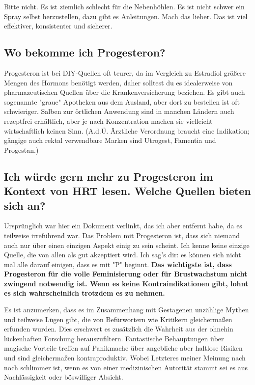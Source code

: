 \documentclass{article}
\begin{document}
Bitte nicht. Es ist ziemlich schlecht für die Nebenhöhlen. Es ist nicht schwer ein Spray selbst herzustellen, dazu gibt es Anleitungen. Mach das lieber. Das ist viel effektiver, konsistenter und sicherer.

\subsection{Wo bekomme ich Progesteron?}

Progesteron ist bei DIY-Quellen oft teurer, da im Vergleich zu Estradiol größere Mengen des Hormons benötigt werden, daher solltest du es idealerweise von pharmazeutischen Quellen über die Krankenversicherung beziehen. Es gibt auch sogenannte "graue" Apotheken aus dem Ausland, aber dort zu bestellen ist oft schwieriger. Salben zur örtlichen Anwendung sind in manchen Ländern auch rezeptfrei erhältlich, aber je nach Konzentration machen sie vielleicht wirtschaftlich keinen Sinn.  (A.d.Ü. Ärztliche Verordnung braucht eine Indikation; gängige auch rektal verwendbare Marken sind Utrogest, Famentia und Progestan.)

\subsection{Ich würde gern mehr zu Progesteron im Kontext von HRT lesen. Welche Quellen bieten sich an?}\label{8-17}

Ursprünglich war hier ein Dokument verlinkt, das ich aber entfernt habe, da es teilweise irreführend war. Das Problem mit Progesteron ist, dass sich niemand auch nur über einen einzigen Aspekt einig zu sein scheint. Ich kenne keine einzige Quelle, die von allen als gut akzeptiert wird. Ich sag's dir: es können sich nicht mal alle darauf einigen, dass es mit "P" beginnt. \textbf{Das wichtigste ist, dass Progesteron für die volle Feminisierung oder für Brustwachstum nicht zwingend notwendig ist. Wenn es keine Kontraindikationen gibt, lohnt es sich wahrscheinlich trotzdem es zu nehmen.}

Es ist anzumerken, dass es im Zusammenhang mit Gestagenen unzählige Mythen und teilweise Lügen gibt, die von Befürwortern wie Kritikern gleichermaßen erfunden wurden. Dies erschwert es zusätzlich die Wahrheit aus der ohnehin lückenhaften Forschung herauszufiltern. Fantastische Behauptungen über magische Vorteile treffen auf Panikmache über angebliche aber haltlose Risiken und sind gleichermaßen kontraproduktiv. Wobei Letzteres meiner Meinung nach noch schlimmer ist, wenn es von einer medizinischen Autorität stammt \textemdash sei es aus Nachlässigkeit oder böswilliger Absicht.
\end{document}
